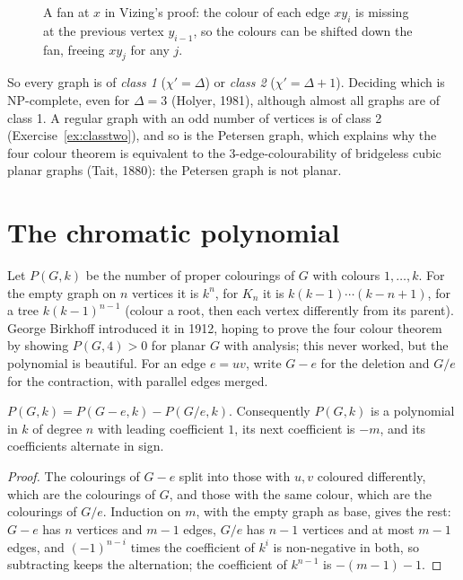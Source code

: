 \begin{figure}[ht]
\centering
{}
\caption{A fan at $x$ in Vizing's proof: the colour of each edge $xy_i$ is missing at the previous vertex $y_{i-1}$, so the colours can be shifted down the fan,
freeing $xy_j$ for any $j$.}
\label{fig:vizing}
\end{figure}

So every graph is of \emph{class 1} ($\chi'=\Delta$) or \emph{class 2} ($\chi'=\Delta+1$). Deciding which is NP-complete, even for $\Delta=3$ (Holyer, 1981), although
almost all graphs are of class 1. A regular graph with an odd number of vertices is of class 2 (Exercise~\ref{ex:classtwo}), and so is the
Petersen graph, which explains why the four colour theorem is equivalent to the $3$-edge-colourability of bridgeless cubic planar graphs (Tait, 1880):
the Petersen graph is not planar.

\section{The chromatic polynomial}

Let $P(G,k)$ be the number of proper colourings of $G$ with colours $1,\dots,k$. For the empty graph on $n$ vertices it is $k^n$, for $K_n$ it is $k(k-1)\cdots(k-n+1)$, for a tree
$k(k-1)^{n-1}$ (colour a root, then each vertex differently from its parent). George Birkhoff introduced it in 1912, hoping to prove the four
colour theorem by showing $P(G,4)>0$ for planar $G$ with analysis; this never worked, but the polynomial is beautiful. For an edge $e=uv$, write $G-e$ for the
deletion and $G/e$ for the contraction, with parallel edges merged.

\begin{proposition}\label{prop:delcon}
$P(G,k)=P(G-e,k)-P(G/e,k)$. Consequently $P(G,k)$ is a polynomial in $k$ of degree $n$ with leading coefficient $1$, its next coefficient is $-m$, and its
coefficients alternate in sign.
\end{proposition}
\begin{proof}
The colourings of $G-e$ split into those with $u,v$ coloured differently, which are the colourings of $G$, and those with the same colour, which are the
colourings of $G/e$. Induction on $m$, with the empty graph as base, gives the rest: $G-e$ has $n$ vertices and $m-1$ edges, $G/e$ has $n-1$ vertices and at most $m-1$
edges, and $(-1)^{n-i}$ times the coefficient of $k^i$ is non-negative in both, so subtracting keeps the alternation; the coefficient of $k^{n-1}$ is $-(m-1)-1$.
\end{proof}

